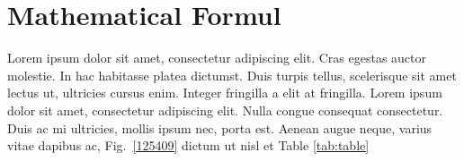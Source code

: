 \section{Mathematical Formul}
\label{igw}

Lorem ipsum dolor sit amet, consectetur adipiscing elit. Cras egestas auctor molestie. In hac habitasse platea dictumst. Duis turpis tellus, scelerisque sit amet lectus ut, ultricies cursus enim. Integer fringilla a elit at fringilla. Lorem ipsum dolor sit amet, consectetur adipiscing elit. Nulla congue consequat consectetur. Duis ac mi ultricies, mollis ipsum nec, porta est. Aenean augue neque, varius vitae dapibus ac, Fig.~\ref{125409} dictum ut nisl et Table \ref{tab:table}
